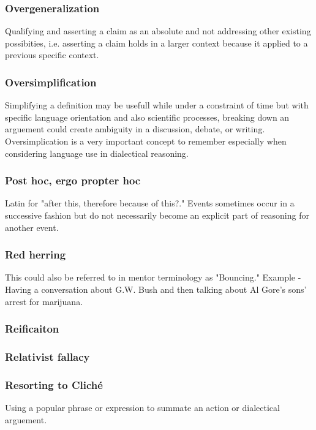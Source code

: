 \subsubsection{Overgeneralization}
Qualifying and asserting a claim as an absolute and not addressing other existing possibities, i.e. asserting a claim holds in a larger context because it applied to a previous specific context.

\subsubsection{Oversimplification}
Simplifying a definition may be usefull while under a constraint of time but with specific language orientation and also scientific processes, breaking down an arguement could create ambiguity in a discussion, debate, or writing. Oversimplication is a very important concept to remember especially when considering language use in dialectical reasoning.

\subsubsection{Post hoc, ergo propter hoc}
Latin for "after this, therefore because of this?." Events sometimes occur in a successive fashion but do not necessarily become an explicit part of reasoning for another event.

\subsubsection{Red herring}
This could also be referred to in mentor terminology as "Bouncing." Example - Having a conversation about G.W. Bush and then talking about Al Gore's sons' arrest for marijuana.

\subsubsection{Reificaiton}

\subsubsection{Relativist fallacy}

\subsubsection{Resorting to Clich\'e}
Using a popular phrase or expression to summate an action or dialectical arguement.

